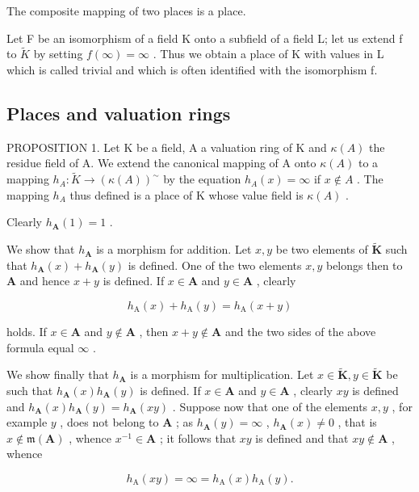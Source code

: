 The composite mapping of two places is a place.

Let F be an isomorphism of a field K onto a subfield of a field L; let us extend f to \(\tilde{K}\) by setting \(f(\infty) = \infty\) . Thus we obtain a place of K with values in L which is called trivial and which is often identified with the isomorphism f.

\subsection{Places and valuation rings}

PROPOSITION 1. Let K be a field, A a valuation ring of K and \(\kappa(A)\) the residue field of A. We extend the canonical mapping of A onto \(\kappa(A)\) to a mapping \(h_{A}: \tilde{K} \to (\kappa(A))^{\sim}\) by the equation \(h_{A}(x) = \infty\) if \(x \notin A\) . The mapping \(h_{A}\) thus defined is a place of K whose value field is \(\kappa(A)\) .

Clearly \(h_{\mathbf{A}}(1) = 1\) .

We show that \(h_{\mathbf{A}}\) is a morphism for addition. Let \(x, y\) be two elements of \(\tilde{\mathbf{K}}\) such that \(h_{\mathbf{A}}(x) + h_{\mathbf{A}}(y)\) is defined. One of the two elements \(x, y\) belongs then to \(\mathbf{A}\) and hence \(x + y\) is defined. If \(x \in \mathbf{A}\) and \(y \in \mathbf{A}\) , clearly

\[
h _ {\mathrm{A}} (x) + h _ {\mathrm{A}} (y) = h _ {\mathrm{A}} (x + y)
\]

holds. If \(x \in \mathbf{A}\) and \(y \notin \mathbf{A}\) , then \(x + y \notin \mathbf{A}\) and the two sides of the above formula equal \(\infty\) .

We show finally that \(h_{\mathbf{A}}\) is a morphism for multiplication. Let \(x \in \tilde{\mathbf{K}}, y \in \tilde{\mathbf{K}}\) be such that \(h_{\mathbf{A}}(x)h_{\mathbf{A}}(y)\) is defined. If \(x \in \mathbf{A}\) and \(y \in \mathbf{A}\) , clearly \(xy\) is defined and \(h_{\mathbf{A}}(x)h_{\mathbf{A}}(y) = h_{\mathbf{A}}(xy)\) . Suppose now that one of the elements \(x, y\) , for example \(y\) , does not belong to \(\mathbf{A}\) ; as \(h_{\mathbf{A}}(y) = \infty\) , \(h_{\mathbf{A}}(x) \neq 0\) , that is \(x \notin \mathfrak{m}(\mathbf{A})\) , whence \(x^{-1} \in \mathbf{A}\) ; it follows that \(xy\) is defined and that \(xy \notin \mathbf{A}\) , whence

\[
h _ {\mathrm{A}} (x y) = \infty = h _ {\mathrm{A}} (x) h _ {\mathrm{A}} (y).
\]

